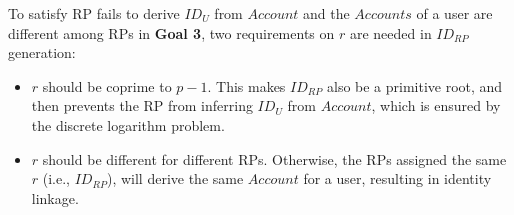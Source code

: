 To satisfy RP fails to derive $ID_U$ from $Account$ and the $Accounts$ of a user are different among RPs in \textbf{Goal 3}, two requirements on $r$ are needed  in $ID_{RP}$ generation:
\begin{itemize}
  \item $r$ should be coprime to $p-1$. This makes $ID_{RP}$ also be  a primitive root, and then prevents the RP from inferring $ID_U$ from $Account$, which is  ensured by the discrete logarithm problem.

  \item  $r$ should be different for different RPs. Otherwise, the RPs assigned the same $r$ (i.e., $ID_{RP}$), will derive the same $Account$ for a user, resulting in identity linkage. %
\end{itemize}






